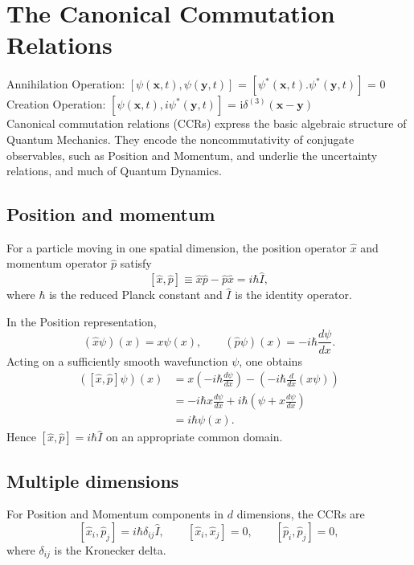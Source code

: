 \documentclass[a4paper, 10pt, onepage]{elegantbook}
\begin{document}
\newpage

\section{The Canonical Commutation Relations}

Annihilation Operation: $[\psi (\mathbf{x}, t), \psi (\mathbf{y}, t)]$ = $[\psi^{*} (\mathbf{x}, t). \psi^{*} (\mathbf{y}, t)]$ = $0$  \\

Creation Operation: $[\psi (\mathbf{x}, t), i \psi^{*} (\mathbf{y}, t)]$  = i$\delta^{(3)} (\mathbf{x} - \mathbf{y})$   \\


Canonical commutation relations (CCRs) express the basic algebraic structure of Quantum Mechanics. They encode the noncommutativity of conjugate observables, such as Position and Momentum, and underlie the uncertainty relations, and much of Quantum Dynamics.

\subsection{Position and momentum}

For a particle moving in one spatial dimension, the position operator
\(\hat{x}\) and momentum operator \(\hat{p}\) satisfy
\[
[\hat{x},\hat{p}]
\equiv \hat{x}\hat{p}-\hat{p}\hat{x}
=i\hbar \hat{I},
\]
where \(\hbar\) is the reduced Planck constant and \(\hat{I}\) is the
identity operator.

In the Position representation,
\[
(\hat{x}\psi)(x)=x\psi(x),
\qquad
(\hat{p}\psi)(x)=-i\hbar\frac{d\psi}{dx}.
\]
Acting on a sufficiently smooth wavefunction \(\psi\), one obtains
\begin{align*}
([\hat{x},\hat{p}]\psi)(x)
&=x\left(-i\hbar\frac{d\psi}{dx}\right)
  -\left(-i\hbar\frac{d}{dx}(x\psi)\right)\\
&=-i\hbar x\frac{d\psi}{dx}
  +i\hbar\left(\psi+x\frac{d\psi}{dx}\right)\\
&=i\hbar\psi(x).
\end{align*}
Hence \([\hat{x},\hat{p}]=i\hbar\hat{I}\) on an appropriate common domain.

\subsection{Multiple dimensions}

For Position and Momentum components in \(d\) dimensions, the CCRs are
\[
[\hat{x}_i,\hat{p}_j]=i\hbar\delta_{ij}\hat{I},
\qquad
[\hat{x}_i,\hat{x}_j]=0,
\qquad
[\hat{p}_i,\hat{p}_j]=0,
\]
where \(\delta_{ij}\) is the Kronecker delta.
\end{document}
